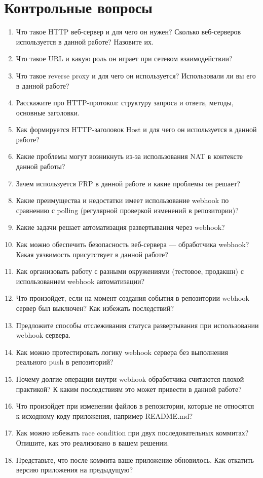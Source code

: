 \documentclass[12pt,a4paper]{article}
\begin{document}
\section{Контрольные вопросы}
\begin{enumerate}
    \item Что такое HTTP веб-сервер и для чего он нужен? Сколько веб-серверов используется в данной работе? Назовите их.
    \item Что такое URL и какую роль он играет при сетевом взаимодействии?
    \item Что такое reverse proxy и для чего он используется? Использовали ли вы его в данной работе?
    \item Расскажите про HTTP-протокол: структуру запроса и ответа, методы, основные заголовки.
    \item Как формируется HTTP-заголовок Host и для чего он используется в данной работе?
    \item Какие проблемы могут возникнуть из-за использования NAT в контексте данной работы?
    \item Зачем используется FRP в данной работе и какие проблемы он решает?
    \item Какие преимущества и недостатки имеет использование webhook по сравнению с polling (регулярной проверкой изменений в репозитории)?
    \item Какие задачи решает автоматизация развертывания через webhook?
    \item Как можно обеспечить безопасность веб-сервера — обработчика webhook? Какая уязвимость присутствует в данной работе?
    \item Как организовать работу с разными окружениями (тестовое, продакшн) с использованием webhook автоматизации?
    \item Что произойдет, если на момент создания события в репозитории webhook сервер был выключен? Как избежать последствий?
    \item Предложите способы отслеживания статуса развертывания при использовании webhook сервера.
    \item Как можно протестировать логику webhook сервера без выполнения реального push в репозиторий?
    \item Почему долгие операции внутри webhook обработчика считаются плохой практикой? К каким последствиям это может привести в данной работе?
    \item Что произойдет при изменении файлов в репозитории, которые не относятся к исходному коду приложения, например README.md?
    \item Как можно избежать race condition при двух последовательных коммитах? Опишите, как это реализовано в вашем решении.
    \item Представьте, что после коммита ваше приложение обновилось. Как откатить версию приложения на предыдущую?
\end{enumerate}
\end{document}
